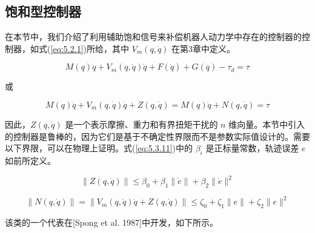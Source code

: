 \documentclass[UTF8,12pt,a4paper]{ctexart}
\begin{document}
\subsection{饱和型控制器}

在本节中，我们介绍了利用辅助饱和信号来补偿机器人动力学中存在的控制器的控制器，如式(\ref{eq:5.2.1})所给，其中 $V_m(q, \dot{q})$ 在第3章中定义。

\begin{equation}\label{eq:5.3.8}
M(q)\ddot{q} + V_m(q, \dot{q})\dot{q} + F(\dot{q}) + G(q) - \tau_d = \tau
\end{equation}

或

\begin{equation}\label{eq:5.3.9}
M(q)\ddot{q} + V_m(q, \dot{q})\dot{q} + Z(q, \dot{q}) = M(q)\ddot{q} + N(q, \dot{q}) = \tau
\end{equation}

因此，$Z(q, \dot{q})$ 是一个表示摩擦、重力和有界扭矩干扰的 $n$ 维向量。本节中引入的控制器是鲁棒的，因为它们是基于不确定性界限而不是参数实际值设计的。需要以下界限，可以在物理上证明。式(\ref{eq:5.3.11})中的 $\beta_i$ 是正标量常数，轨迹误差 $e$ 如前所定义。

\begin{equation}\label{eq:5.3.10}
\|Z(q, \dot{q})\| \leq \beta_0 + \beta_1\|\dot{e}\| + \beta_2\|\dot{e}\|^2
\end{equation}

\begin{equation}\label{eq:5.3.11}
\|N(q, \dot{q})\| = \|V_m(q, \dot{q})\dot{q} + Z(q, \dot{q})\| \leq \zeta_0 + \zeta_1\|e\| + \zeta_2\|e\|^2
\end{equation}

该类的一个代表在[Spong et al. 1987]中开发，如下所示。
\end{document}

